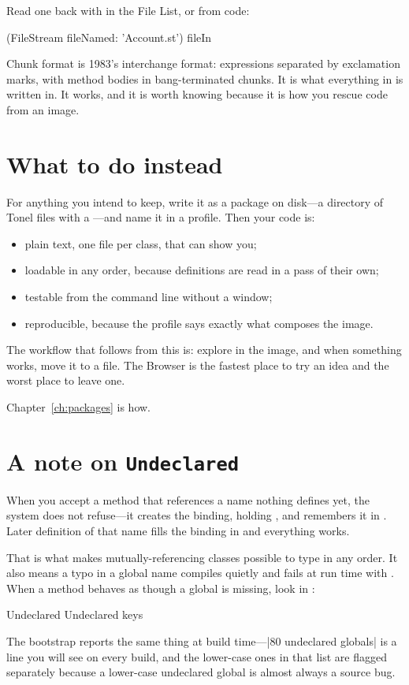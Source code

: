 Read one back with  in the File List, or from code:

\begin{st}
(FileStream fileNamed: 'Account.st') fileIn
\end{st}

Chunk format is 1983's interchange format: expressions separated by
exclamation marks, with method bodies in bang-terminated chunks. It is what
everything in  is written in. It works, and it is worth knowing
because it is how you rescue code from an image.

\section{What to do instead}

For anything you intend to keep, write it as a package on disk---a directory
of Tonel files with a ---and name it in a profile. Then your
code is:

\begin{itemize}
\item plain text, one file per class, that  can show you;
\item loadable in any order, because definitions are read in a pass of their
  own;
\item testable from the command line without a window;
\item reproducible, because the profile says exactly what composes the image.
\end{itemize}

The workflow that follows from this is: explore in the image, and when
something works, move it to a file. The Browser is the fastest place to try an
idea and the worst place to leave one.

Chapter~\ref{ch:packages} is how.

\section{A note on \texttt{Undeclared}}

When you accept a method that references a name nothing defines yet, the
system does not refuse---it creates the binding, holding , and
remembers it in . Later definition of that name fills the
binding in and everything works.

That is what makes mutually-referencing classes possible to type in any order.
It also means a typo in a global name compiles quietly and fails at run time
with . When a method behaves as though a global is
missing, look in :

\begin{st}
Undeclared
Undeclared keys
\end{st}

The bootstrap reports the same thing at build time---\ct|80 undeclared globals| is a line you will see on every build, and the lower-case ones in
that list are flagged separately because a lower-case undeclared global is
almost always a source bug.
